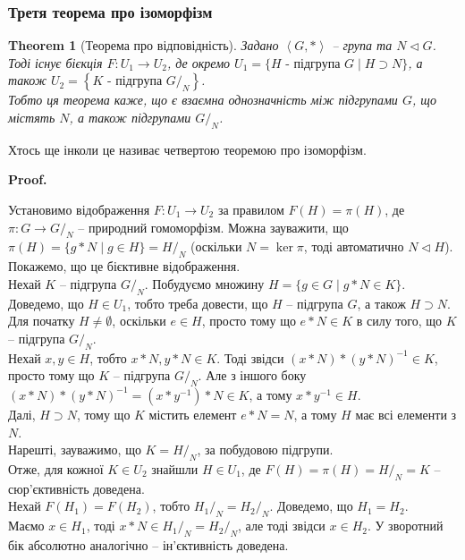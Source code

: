 \documentclass[a4paper, 10pt]{article}
\makeatletter
\theoremstyle{theoremdd}
\newtheorem{theorem}{Theorem}[subsection]
\theoremstyle{theoremdd}
\theoremstyle{theoremdd}
\theoremstyle{theoremdd}
\theoremstyle{theoremdd}
\theoremstyle{theoremdd}
\theoremstyle{theoremdd}
\theoremstyle{theoremdd}
\theoremstyle{theoremdd}
\theoremstyle{theoremdd}
\theoremstyle{theoremdd}
\newtheorem{remark}[theorem]{Remark}
\theoremstyle{theoremdd}
\theoremstyle{theoremdd}
\theoremstyle{theoremdd}
\theoremstyle{theoremdd}
\renewenvironment{proof}[1][Proof.\\]{\par
\pushQED{\hfill \qed}%
\normalfont \topsep6\p@\@plus6\p@\relax
\trivlist
\item\relax
{\bfseries
#1\@addpunct{.}}\hspace\labelsep\ignorespaces
}{%
\popQED\endtrivlist\@endpefalse
}
\makeatother
\begin{document}
\iffalse
\begin{remark}
До речі, коли ми шукали ядро, ми одночасно довели, що $H \cap N = \ker \varphi \triangleleft H$, тобто перша лема могла бути зайвою. (*)
\end{remark}
\fi

\subsubsection{Третя теорема про ізоморфізм}
\begin{theorem}[Теорема про відповідність]
Задано $\left< G, * \right>$ -- група та $N \triangleleft G$. Тоді існує бієкція $F \colon U_1 \to U_2$, де окремо $U_1 = \{ H \text{ - підгрупа } G \mid H \supset N\}$, а також $U_2 = \left\{ K \text{ - підгрупа } G/_N\right\}$.\\
Тобто ця теорема каже, що є взаємна однозначність між підгрупами $G$, що містять $N$, а також підгрупами $G/_N$.
\end{theorem}

Хтось ще інколи це називає четвертою теоремою про ізоморфізм.

\begin{proof}
Установимо відображення $F \colon U_1 \to U_2$ за правилом $F(H) = \pi(H)$, де $\pi \colon G \to G/_N$ -- природний гомоморфізм. Можна зауважити, що $\pi(H) = \{g*N \mid g \in H\} = H/_N$ (оскільки $N = \ker \pi$, тоді автоматично $N \triangleleft H$). Покажемо, що це бієктивне відображення.\\
Нехай $K$ -- підгрупа $G/_N$. Побудуємо множину $H = \{g \in G \mid g*N \in K\}$. Доведемо, що $H \in U_1$, тобто треба довести, що $H$ -- підгрупа $G$, а також $H \supset N$.\\
Для початку $H \neq \emptyset$, оскільки $e \in H$, просто тому що $e*N \in K$ в силу того, що $K$ -- підгрупа $G/_N$.\\
Нехай $x,y \in H$, тобто $x*N,y*N \in K$. Тоді звідси $(x*N)*(y*N)^{-1} \in K$, просто тому що $K$ -- підгрупа $G/_N$. Але з іншого боку $(x*N)*(y*N)^{-1} = (x*y^{-1})*N \in K$, а тому $x*y^{-1} \in H$.\\
Далі, $H \supset N$, тому що $K$ містить елемент $e*N = N$, а тому $H$ має всі елементи з $N$.\\
Нарешті, зауважимо, що $K = H/_N$, за побудовою підгрупи.\\
Отже, для кожної $K \in U_2$ знайшли $H \in U_1$, де $F(H) = \pi(H) = H/_N = K$ -- сюр'єктивність доведена.\\
Нехай $F(H_1) = F(H_2)$, тобто $H_1/_N = H_2/_N$. Доведемо, що $H_1 = H_2$.\\
Маємо $x \in H_1$, тоді $x*N \in H_1/_N = H_2/_N$, але тоді звідси $x \in H_2$. У зворотний бік абсолютно аналогічно -- ін'єктивність доведена.
\end{proof}
\end{document}
